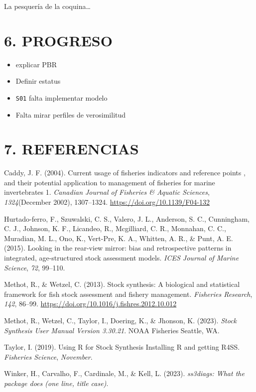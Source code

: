 \documentclass[
]{article}
\newlength{\cslhangindent}
\newlength{\cslentryspacingunit} %
\newenvironment{CSLReferences}[2] %
 {%
  \setlength{\parindent}{0pt}
  \ifodd #1
  \let\oldpar\par
  \def\par{\hangindent=\cslhangindent\oldpar}
  \fi
  \setlength{\parskip}{#2\cslentryspacingunit}
 }%
 {}
\begin{document}
La pesquería de la coquina\ldots{}

\pagebreak

\hypertarget{progreso}{%
\section{6. PROGRESO}\label{progreso}}

\begin{itemize}
\item
  explicar PBR
\item
  Definir estatus
\item
  \texttt{S01} falta implementar modelo
\item
  Falta mirar perfiles de verosimilitud
\end{itemize}

\pagebreak

\hypertarget{referencias}{%
\section*{7. REFERENCIAS}\label{referencias}}

\hypertarget{refs}{}
\begin{CSLReferences}{1}{0}
\leavevmode{}%
Caddy, J. F. (2004). {Current usage of fisheries indicators and reference points , and their potential application to management of fisheries for marine invertebrates 1}. \emph{Canadian Journal of Fisheries {\&} Aquatic Sciences}, \emph{1324}(December 2002), 1307--1324. \url{https://doi.org/10.1139/F04-132}

\leavevmode{}%
Hurtado-ferro, F., Szuwalski, C. S., Valero, J. L., Anderson, S. C., Cunningham, C. J., Johnson, K. F., Licandeo, R., Mcgilliard, C. R., Monnahan, C. C., Muradian, M. L., Ono, K., Vert-Pre, K. A., Whitten, A. R., \& Punt, A. E. (2015). {Looking in the rear-view mirror: bias and retrospective patterns in integrated, age-structured stock assessment models}. \emph{ICES Journal of Marine Science}, \emph{72}, 99--110.

\leavevmode{}%
Methot, R., \& Wetzel, C. (2013). {Stock synthesis: A biological and statistical framework for fish stock assessment and fishery management}. \emph{Fisheries Research}, \emph{142}, 86--99. \url{https://doi.org/10.1016/j.fishres.2012.10.012}

\leavevmode{}%
Methot, R., Wetzel, C., Taylor, I., Doering, K., \& Jhonson, K. (2023). \emph{{Stock Synthesis User Manual Version 3.30.21}}. NOAA Fisheries Seattle, WA.

\leavevmode{}%
Taylor, I. (2019). {Using R for Stock Synthesis Installing R and getting R4SS}. \emph{Fisheries Science}, \emph{November}.

\leavevmode{}%
Winker, H., Carvalho, F., Cardinale, M., \& Kell, L. (2023). \emph{ss3diags: What the package does (one line, title case)}.

\end{CSLReferences}
\end{document}
